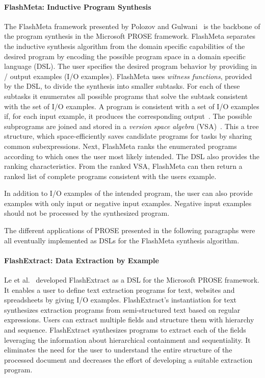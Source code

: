 \documentclass[\myrootdir/main.tex]{subfiles}
\begin{document}
\paragraph{FlashMeta: Inductive Program Synthesis}
The FlashMeta framework presented by Polozov and Gulwani~\cite{polozov2015flashmeta:} is the backbone of the program synthesis in the Microsoft PROSE framework.
FlashMeta separates the inductive synthesis algorithm from the domain specific capabilities of the desired program by encoding the possible program space in a domain specific language (DSL).
The user specifies the desired program behavior by providing in / output examples (I/O examples).
FlashMeta uses \emph{witness functions}, provided by the DSL, to divide the synthesis into smaller subtasks.
For each of these subtasks it enumerates all possible programs that solve the subtask consistent with the set of I/O examples.
A program is consistent with a set of I/O examples if, for each input example, it produces the corresponding output~\cite{mitchell1982generalization}.
The possible subprograms are joined and stored in a \emph{version space algebra} (VSA)~\cite{mitchell1982generalization}.
This a tree structure, which space-efficiently saves candidate programs for tasks by sharing common subexpressions.
Next, FlashMeta ranks the enumerated programs according to which ones the user most likely intended.
The DSL also provides the ranking characteristics.
From the ranked VSA, FlashMeta can then return a ranked list of complete programs consistent with the users example.

In addition to I/O examples of the intended program, the user can also provide examples with only input or negative input examples.
Negative input examples should not be processed by the synthesized program.

The different applications of PROSE presented in the following paragraphs were all eventually implemented as DSLs for the FlashMeta synthesis algorithm.

\paragraph{FlashExtract: Data Extraction by Example}
Le et al.~\cite{le2014flashextract:} developed FlashExtract as a DSL for the Microsoft PROSE framework.
It enables a user to define text extraction programs for text, websites and spreadsheets by giving I/O examples.
FlashExtract's instantiation for text synthesizes extraction programs from semi-structured text based on regular expressions.
Users can extract multiple fields and structure them with hierarchy and sequence.
FlashExtract synthesizes programs to extract each of the fields leveraging the information about hierarchical containment and sequentiality.
It eliminates the need for the user to understand the entire structure of the processed document and decreases the effort of developing a suitable extraction program.
\end{document}
